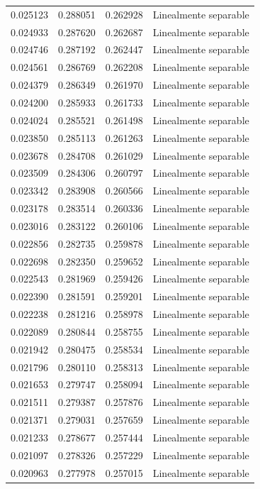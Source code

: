 \begin{tabular}{llll}
0.025123 & 0.288051 & 0.262928 & Linealmente separable \\
0.024933 & 0.287620 & 0.262687 & Linealmente separable \\
0.024746 & 0.287192 & 0.262447 & Linealmente separable \\
0.024561 & 0.286769 & 0.262208 & Linealmente separable \\
0.024379 & 0.286349 & 0.261970 & Linealmente separable \\
0.024200 & 0.285933 & 0.261733 & Linealmente separable \\
0.024024 & 0.285521 & 0.261498 & Linealmente separable \\
0.023850 & 0.285113 & 0.261263 & Linealmente separable \\
0.023678 & 0.284708 & 0.261029 & Linealmente separable \\
0.023509 & 0.284306 & 0.260797 & Linealmente separable \\
0.023342 & 0.283908 & 0.260566 & Linealmente separable \\
0.023178 & 0.283514 & 0.260336 & Linealmente separable \\
0.023016 & 0.283122 & 0.260106 & Linealmente separable \\
0.022856 & 0.282735 & 0.259878 & Linealmente separable \\
0.022698 & 0.282350 & 0.259652 & Linealmente separable \\
0.022543 & 0.281969 & 0.259426 & Linealmente separable \\
0.022390 & 0.281591 & 0.259201 & Linealmente separable \\
0.022238 & 0.281216 & 0.258978 & Linealmente separable \\
0.022089 & 0.280844 & 0.258755 & Linealmente separable \\
0.021942 & 0.280475 & 0.258534 & Linealmente separable \\
0.021796 & 0.280110 & 0.258313 & Linealmente separable \\
0.021653 & 0.279747 & 0.258094 & Linealmente separable \\
0.021511 & 0.279387 & 0.257876 & Linealmente separable \\
0.021371 & 0.279031 & 0.257659 & Linealmente separable \\
0.021233 & 0.278677 & 0.257444 & Linealmente separable \\
0.021097 & 0.278326 & 0.257229 & Linealmente separable \\
0.020963 & 0.277978 & 0.257015 & Linealmente separable \\

\end{tabular}
